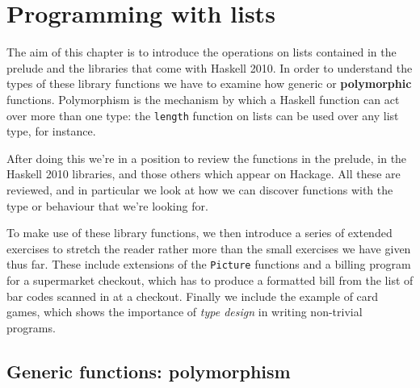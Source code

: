 %

\chapter{Programming with lists}
\chapstart
\label{progLists}


The aim of this chapter is to introduce the operations on lists contained in the prelude and the libraries that come with Haskell 2010. In order to understand the types of these library functions we 
have to examine how generic or \textbf{polymorphic} functions.
Polymorphism is the mechanism by which a Haskell
function can act over more than one type: the \texttt{length} function
on lists can be used over any list type, for instance. 

After doing this we're in a position to review the functions in the prelude, in the Haskell 2010 libraries, and those others which appear on Hackage. All these are reviewed, and in particular we look at how we can discover functions with the type or behaviour that we're looking for.

To make use of these library functions, we then introduce a series of extended exercises to stretch the reader
rather more than the small exercises we have given thus far. These include extensions of the \texttt{Picture} functions and a billing program for a supermarket checkout, which has to produce
a formatted bill from the list of bar codes scanned in at a checkout. Finally we include the example of card games, which shows the importance of \emph{type design} in writing non-trivial programs.

\begin{webvideos}
\end{webvideos}

\section{Generic functions: polymorphism}
\label{poly}
 
